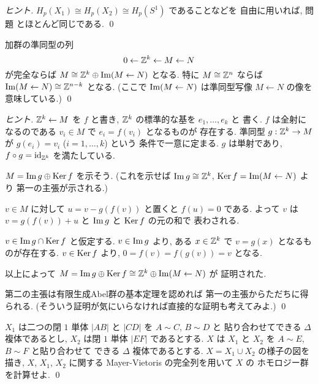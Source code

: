 \documentclass[12pt,twoside]{jarticle}
\begin{document}
\begin{proof}[ヒント]
  $H_p(X_1)\cong H_p(X_2)\cong H_p(S^1)$ であることなどを
  自由に用いれば, 問題  とほとんど同じである.
  \qed
\end{proof}

\begin{question}[この結果もよく使われる]
\label{q:0ZMN}
  加群の準同型の列
  \begin{equation*}
    0 \leftarrow {\mathbb Z}^k \leftarrow M \leftarrow N
  \end{equation*}
  が完全ならば $M \cong {\mathbb Z}^k\oplus \mathop{\mathrm{Im}}\nolimits(M\leftarrow N)$ となる.
  特に $M\cong {\mathbb Z}^n$ ならば $\mathop{\mathrm{Im}}\nolimits(M\leftarrow N)\cong {\mathbb Z}^{n-k}$ となる.
  (ここで $\mathop{\mathrm{Im}}\nolimits(M\leftarrow N)$ は準同型写像 $M\leftarrow N$ の像を
  意味している.)
  \qed
\end{question}

\begin{proof}[ヒント]
  ${\mathbb Z}^k\leftarrow M$ を $f$ と書き, ${\mathbb Z}^k$ の標準的な基を $e_1,\ldots,e_k$ と
  書く.  $f$ は全射になるのである $v_i\in M$ で $e_i=f(v_i)$ となるものが
  存在する. 準同型 $g:{\mathbb Z}^k\to M$ が $g(e_i)=v_i$ ($i=1,\ldots,k$) という
  条件で一意に定まる. $g$ は単射であり, $f\circ g=\mathop{\mathrm{id}}\nolimits_{{\mathbb Z}^k}$ を満たしている.

  $M=\mathop{\mathrm{Im}}\nolimits g\oplus\mathop{\mathrm{Ker}}\nolimits f$ を示そう.
  (これを示せば $\mathop{\mathrm{Im}}\nolimits g \cong{\mathbb Z}^k$, $\mathop{\mathrm{Ker}}\nolimits f=\mathop{\mathrm{Im}}\nolimits(M\leftarrow N)$ より
  第一の主張が示される.)

  $v\in M$ に対して $u=v-g(f(v))$ と置くと $f(u)=0$ である.
  よって $v$ は $v=g(f(v))+u$ と $\mathop{\mathrm{Im}}\nolimits g$ と $\mathop{\mathrm{Ker}}\nolimits f$ の元の和で
  表わされる.

  $v\in\mathop{\mathrm{Im}}\nolimits g\cap\mathop{\mathrm{Ker}}\nolimits f$ と仮定する. 
  $v\in\mathop{\mathrm{Im}}\nolimits g$ より, ある $x\in{\mathbb Z}^k$ で $v=g(x)$ となるものが存在する. 
  $v\in\mathop{\mathrm{Ker}}\nolimits f$ より, $0=f(v)=f(g(v))=v$ となる.
  
  以上によって $M=\mathop{\mathrm{Im}}\nolimits g\oplus\mathop{\mathrm{Ker}}\nolimits f\cong{\mathbb Z}^k\oplus\mathop{\mathrm{Im}}\nolimits(M\leftarrow N)$ が
  証明された.

  第二の主張は有限生成Abel群の基本定理を認めれば
  第一の主張からただちに得られる.
  (そういう証明が気にいらなければ直接的な証明も考えてみよ.)
  \qed
\end{proof}

\begin{question}[日2]
  \label{q:hi-2}
  $X_1$ は二つの閉 $1$ 単体 $|AB|$ と $|CD|$ を $A\sim C$, $B\sim D$ と
  貼り合わせてできる $\Delta$ 複体であるとし, 
  $X_2$ は閉 $1$ 単体 $|EF|$ であるとする.
  $X$ は $X_1$ と $X_2$ を $A\sim E$, $B\sim F$ と貼り合わせて
  できる $\Delta$ 複体であるとする. $X=X_1\cup X_2$ の様子の図を描き, 
  $X$, $X_1$, $X_2$ に関する Mayer-Vietoris の完全列を用いて $X$ の
  ホモロジー群を計算せよ. 
  \qed
\end{question}
\end{document}
